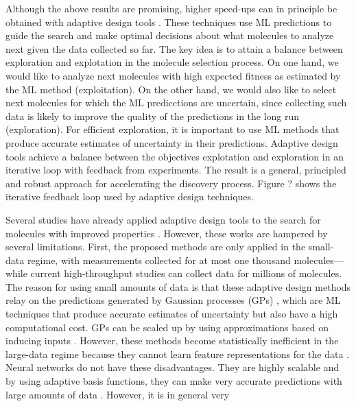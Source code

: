 Although the above results are promising, higher speed-ups can in principle be
obtained with adaptive design tools \cite{jones1998efficient}. These techniques
use ML predictions to guide the search and make optimal decisions about what
molecules to analyze next given the data collected so far. The key idea is to
attain a balance between exploration and explotation in the molecule selection
process. On one hand, we would like to analyze next molecules with high
expected fitness as estimated by the ML method (exploitation). On the other
hand, we would also like to select next molecules for which the ML predicctions
are uncertain, since collecting such data is likely to improve the quality of
the predictions in the long run (exploration). For efficient
exploration, it is important to use ML methods that produce accurate
estimates of uncertainty in their predictions. 
Adaptive design tools achieve a balance
between the objectives explotation and exploration in an iterative loop with
feedback from experiments. 
The result is a general, principled and robust
approach for accelerating the discovery process. 
Figure ? shows the iterative
feedback loop used by adaptive design techniques.

Several studies have already applied adaptive design tools to the search for
molecules with improved properties
\cite{xue2016accelerated,negoescu2011knowledge,de2008active}. However, these
works are hampered by several limitations. First, the proposed methods are only
applied in the small-data regime, with measurements collected for at most one
thousand molecules---while current high-throughput studies can collect data for
millions of molecules. The reason for using small amounts of data is that these
adaptive design methods relay on the predictions generated by Gaussian
processes (GPs) \cite{rasmussen2006gaussian}, which are ML techniques that
produce accurate estimates of uncertainty but also have a high computational
cost. GPs can be scaled up by using approximations based on inducing inputs
\cite{snelson2005sparse,hensman2015scalable}. However, these methods become
statistically inefficient in the large-data regime because they cannot learn
feature representations for the data \cite{bengio2007scaling}.
Neural networks do not have these disadvantages. They are highly scalable and
by using adaptive basis functions, they can make very accurate predictions with
large amounts of data \cite{lecun2015deep}. However, it is in general very